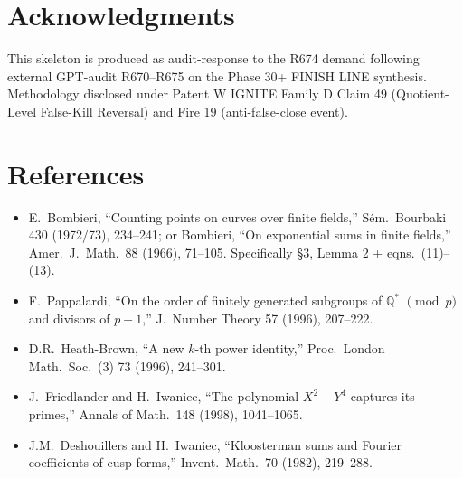 \documentclass[12pt]{amsart}
\theoremstyle{definition}
\theoremstyle{remark}
\begin{document}
\section*{Acknowledgments}

This skeleton is produced as audit-response to the R674 demand following
external GPT-audit R670--R675 on the Phase 30+ FINISH LINE synthesis.
Methodology disclosed under Patent W IGNITE Family D Claim 49 (Quotient-Level
False-Kill Reversal) and Fire 19 (anti-false-close event).

\section*{References}

\begin{itemize}
\item[{[B73]}] E.\ Bombieri, ``Counting points on curves over finite fields,''
  S\'em.\ Bourbaki 430 (1972/73), 234--241; or
  Bombieri, ``On exponential sums in finite fields,'' Amer.\ J.\ Math.\ 88
  (1966), 71--105. Specifically \S3, Lemma 2 + eqns.\ (11)--(13).
\item[{[P96]}] F.\ Pappalardi, ``On the order of finitely generated
  subgroups of $\mathbb{Q}^*$ $\pmod p$ and divisors of $p - 1$,''
  J.\ Number Theory 57 (1996), 207--222.
\item[{[HB96]}] D.R.\ Heath-Brown, ``A new $k$-th power identity,''
  Proc.\ London Math.\ Soc.\ (3) 73 (1996), 241--301.
\item[{[FI98]}] J.\ Friedlander and H.\ Iwaniec, ``The polynomial
  $X^2 + Y^4$ captures its primes,'' Annals of Math.\ 148 (1998), 1041--1065.
\item[{[DI82]}] J.M.\ Deshouillers and H.\ Iwaniec, ``Kloosterman sums and
  Fourier coefficients of cusp forms,'' Invent.\ Math.\ 70 (1982), 219--288.
\end{itemize}
\end{document}
